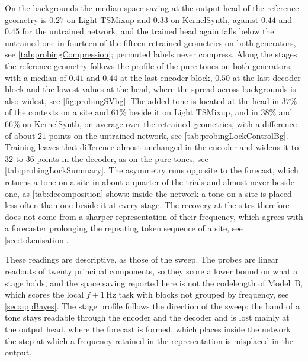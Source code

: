 {On the backgrounds the median space saving at the output head of the reference geometry is $0.27$ on Light TSMixup and $0.33$ on KernelSynth, against $0.44$ and $0.45$ for the untrained network, and the trained head again falls below the untrained one in fourteen of the fifteen retrained geometries on both generators, see \autoref{tab:probingCompression}; permuted labels never compress. Along the stages the reference geometry follows the profile of the pure tones on both generators, with a median of $0.41$ and $0.44$ at the last encoder block, $0.50$ at the last decoder block and the lowest values at the head, where the spread across backgrounds is also widest, see \autoref{fig:probingSVbg}. The added tone is located at the head in $37\%$ of the contexts on a site and $61\%$ beside it on Light TSMixup, and in $38\%$ and $66\%$ on KernelSynth, on average over the retrained geometries, with a difference of about $21$ points on the untrained network, see \autoref{tab:probingLockControlBg}. Training leaves that difference almost unchanged in the encoder and widens it to $32$ to $36$ points in the decoder, as on the pure tones, see \autoref{tab:probingLockSummary}. The asymmetry runs opposite to the forecast, which returns a tone on a site in about a quarter of the trials and almost never beside one, as \autoref{tab:decomposition} shows: inside the network a tone on a site is placed less often than one beside it at every stage. The recovery at the sites therefore does not come from a sharper representation of their frequency, which agrees with a forecaster prolonging the repeating token sequence of a site, see \autoref{sec:tokenisation}.

These readings are descriptive, as those of the sweep. The probes are linear readouts of twenty principal components, so they score a lower bound on what a stage holds, and the space saving reported here is not the codelength of Model~B, which scores the local $f\pm1$\,Hz task with blocks not grouped by frequency, see \autoref{sec:appBayes}. The stage profile follows the direction of the sweep: the band of a tone stays readable through the encoder and the decoder and is lost mainly at the output head, where the forecast is formed, which places inside the network the step at which a frequency retained in the representation is misplaced in the output.
}
